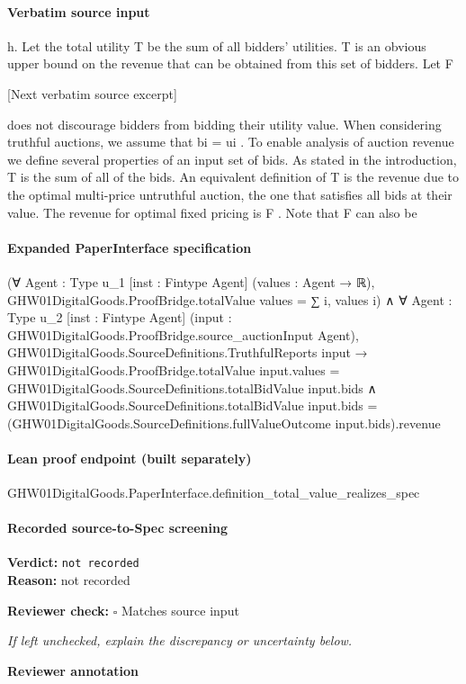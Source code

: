 \documentclass[10pt]{article}
\newcommand{\reviewerbox}{%
  \par\noindent\fbox{\parbox{0.96\linewidth}{\rule{0pt}{0.38in}}}\par
}
\newcommand{\reviewmatch}[1]{%
  \par\noindent\textbf{Reviewer check:} $\square$\; #1\par
  \noindent\emph{If left unchecked, explain the discrepancy or uncertainty below.}\par
}
\begin{document}
\paragraph{Verbatim source input}
\begin{ReviewVerbatim}
h. Let the total utility T be the sum of all bidders’
utilities. T is an obvious upper bound on the revenue
that can be obtained from this set of bidders. Let F

[Next verbatim source excerpt]

does not discourage bidders from bidding their utility value. When considering truthful auctions, we
assume that bi = ui .
To enable analysis of auction revenue we define several properties of an input set of bids. As stated in
the introduction, T is the sum of all of the bids. An
equivalent definition of T is the revenue due to the
optimal multi-price untruthful auction, the one that
satisfies all bids at their value. The revenue for optimal fixed pricing is F . Note that F can also be
\end{ReviewVerbatim}


\paragraph{Expanded PaperInterface specification}
\begin{ReviewVerbatim}
(∀ {Agent : Type u_1} [inst : Fintype Agent] (values : Agent → ℝ),
    GHW01DigitalGoods.ProofBridge.totalValue values = ∑ i, values i) ∧
  ∀ {Agent : Type u_2} [inst : Fintype Agent] (input : GHW01DigitalGoods.ProofBridge.source_auctionInput Agent),
    GHW01DigitalGoods.SourceDefinitions.TruthfulReports input →
      GHW01DigitalGoods.ProofBridge.totalValue input.values =
          GHW01DigitalGoods.SourceDefinitions.totalBidValue input.bids ∧
        GHW01DigitalGoods.SourceDefinitions.totalBidValue input.bids =
          (GHW01DigitalGoods.SourceDefinitions.fullValueOutcome input.bids).revenue
\end{ReviewVerbatim}

\paragraph{Lean proof endpoint (built separately)}\begin{ReviewVerbatim}
GHW01DigitalGoods.PaperInterface.definition_total_value_realizes_spec
\end{ReviewVerbatim}

\paragraph{Recorded source-to-Spec screening}
\textbf{Verdict:} \texttt{not recorded}
\\
\textbf{Reason:} not recorded
\reviewmatch{Matches source input}
\noindent\textbf{Reviewer annotation}\par
\reviewerbox
\clearpage
\hypertarget{source-claim-11a904f37ac25550}{}
\end{document}
